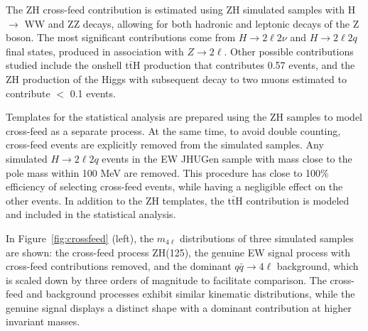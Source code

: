 The ZH cross-feed contribution is estimated using \onshell ZH simulated samples with H $\to$ WW and ZZ decays, allowing for both hadronic and leptonic decays of the Z boson. The most significant contributions come from $H \to 2\ell 2\nu$ and $H \to 2\ell 2q$ final states, produced in association with $Z \to 2\ell$. Other possible contributions studied include the onshell t$\bar{\text{t}}$H production that contributes 0.57 events, and the ZH production of the Higgs with subsequent decay to two muons estimated to contribute $<$ 0.1 events. 

Templates for the statistical analysis are prepared using the \onshell ZH samples to model cross-feed
as a separate \onshell process. 
At the same time, to avoid double counting, \onshell cross-feed events are explicitly removed from the \offshell simulated samples.
Any simulated $H\to 2\ell 2q$ events in the \offshell EW JHUGen sample with mass close 
to the \Hboson pole mass within 100 MeV are removed. This procedure has close to 100\%
efficiency of selecting \onshell cross-feed events, while having a negligible effect on the other events. In addition to the ZH templates, the t$\bar{\text{t}}$H contribution is modeled and included in the statistical analysis. 

In Figure~\ref{fig:crossfeed} (left), the $m_{4\ell}$ distributions of three simulated samples are shown: the \onshell cross-feed process ZH(125), the genuine \offshell EW signal process with cross-feed contributions removed, and the dominant $q\bar{q} \to 4\ell$ background, which is scaled down by three orders of magnitude to facilitate comparison. The cross-feed and background processes exhibit similar kinematic distributions, while the genuine \offshell signal displays a distinct shape with a dominant contribution at higher invariant masses.

